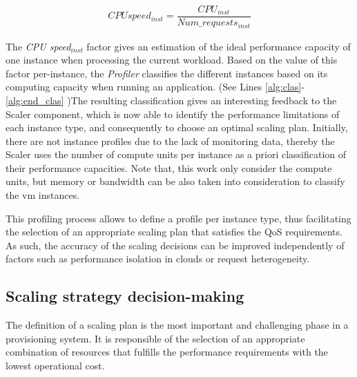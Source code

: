 \begin{enumerate}
{\scriptsize
\begin{equation}\label{cpu_speed}
\begin{split}
CPU speed_{inst} = \dfrac{  CPU_{inst} } {Num\_requests_{inst} } 
\end{split}
\end{equation}
}

The \emph{CPU speed$_{inst}$} factor gives an estimation of the ideal performance capacity of one instance when processing the current workload. Based on the value of this factor per-instance, the \emph{Profiler} classifies the different instances based on its computing capacity when running an application. (See Lines \ref{alg:clas}-\ref{alg:end_clas} )The resulting classification gives an interesting feedback to the Scaler component, which is now able to identify the performance limitations of each instance type, and consequently to choose an optimal scaling plan. Initially, there are not instance profiles due to the lack of monitoring data, thereby the Scaler uses the number of compute units per instance as a priori classification of their performance capacities. Note that, this work only consider the compute units, but memory or bandwidth can be also taken into consideration to classify the vm instances.

\end{enumerate}

This profiling process allows to define a profile per instance type, thus facilitating the selection of an appropriate scaling plan that satisfies the QoS requirements. As such, the accuracy of the scaling decisions can be improved independently of factors such as performance isolation in clouds or request heterogeneity.


\subsection{Scaling strategy decision-making}

The definition of a scaling plan is the most important and challenging phase in a provisioning system. It is responsible of the selection of an appropriate combination of resources that fulfills the performance requirements with the lowest operational cost. 


